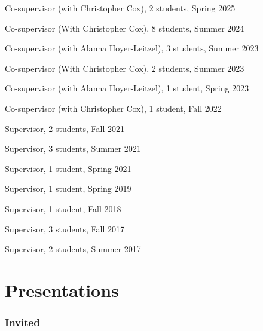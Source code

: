 \documentclass[10pt,letterpaper]{article}
\renewenvironment{itemize}{
  \begin{list}{}{
    \setlength{\leftmargin}{1.5em}
    \setlength{\itemsep}{0.25em}
    \setlength{\parskip}{0pt}
    \setlength{\parsep}{0.25em}
  }
}{
  \end{list}
}
\providecommand{\tightlist}{%
  \setlength{\itemsep}{0pt}\setlength{\parskip}{0pt}}
\let\tightlist\relax
\begin{document}
\begin{itemize}
  \begin{itemize}
  \tightlist
  \item
    Co-supervisor (with Christopher Cox), 2 students, Spring 2025
  \item
    Co-supervisor (With Christopher Cox), 8 students, Summer 2024
  \item
    Co-supervisor (with Alanna Hoyer-Leitzel), 3 students, Summer 2023
  \item
    Co-supervisor (With Christopher Cox), 2 students, Summer 2023
  \item
    Co-supervisor (with Alanna Hoyer-Leitzel), 1 student, Spring 2023
  \item
    Co-supervisor (with Christopher Cox), 1 student, Fall 2022
  \item
    Supervisor, 2 students, Fall 2021
  \item
    Supervisor, 3 students, Summer 2021
  \item
    Supervisor, 1 student, Spring 2021
  \item
    Supervisor, 1 student, Spring 2019
  \item
    Supervisor, 1 student, Fall 2018
  \item
    Supervisor, 3 students, Fall 2017
  \item
    Supervisor, 2 students, Summer 2017
  \end{itemize}
\end{itemize}

\hypertarget{invited-presentations}{%
\section*{Presentations}\label{invited-presentations}}

\hypertarget{invited}{%
\subsubsection*{Invited}\label{invited}}
\end{document}
